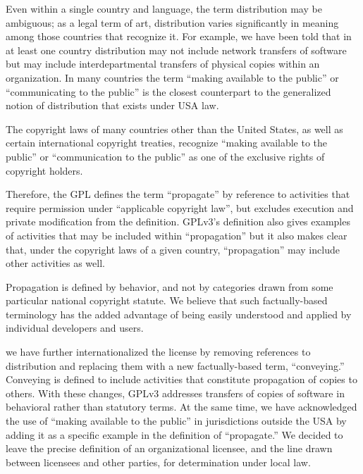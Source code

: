 
Even within a single country and language, the term distribution may be
ambiguous; as a legal term of art, distribution varies significantly in
meaning among those countries that recognize it.  For example, we have been
told that in at least one country distribution may not include network
transfers of software but may include interdepartmental transfers of physical
copies within an organization.  In many countries the term ``making available
to the public'' or ``communicating to the public'' is the closest counterpart
to the generalized notion of distribution that exists under USA law.


The
copyright laws of many countries other than the United States, as well
as certain international copyright treaties, recognize ``making
available to the public'' or ``communication to the public'' as one of
the exclusive rights of copyright holders.

Therefore, the GPL defines the term ``propagate'' by reference to activities
that require permission under ``applicable copyright law'', but excludes
execution and private modification from the definition.  GPLv3's definition
also gives examples of activities that may be included within ``propagation''
but it also makes clear that, under the copyright laws of a given country,
``propagation'' may include other activities as well.


Propagation is defined by behavior, and not by categories drawn from some
particular national copyright statute.  We believe that such factually-based
terminology has the added advantage of being easily understood and applied by
individual developers and users.


we have further internationalized the license by removing references to
distribution and replacing them with a new factually-based term,
``conveying.'' Conveying is defined to include activities that constitute
propagation of copies to others.  With these changes, GPLv3 addresses
transfers of copies of software in behavioral rather than statutory terms.
At the same time, we have acknowledged the use of ``making available to the
public'' in jurisdictions outside the USA by adding it as a specific example
in the definition of ``propagate.'' We decided to leave the precise
definition of an organizational licensee, and the line drawn between
licensees and other parties, for determination under local law.

